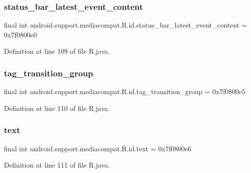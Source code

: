 \subsubsection{\texorpdfstring{status\_bar\_latest\_event\_content}{status\_bar\_latest\_event\_content}}
{\footnotesize\ttfamily final int android.\+support.\+mediacompat.\+R.\+id.\+status\+\_\+bar\+\_\+latest\+\_\+event\+\_\+content = 0x7f0800e0\hspace{0.3cm}{\ttfamily [static]}}



Definition at line 109 of file R.\+java.

\mbox{\label{classandroid_1_1support_1_1mediacompat_1_1_r_1_1id_a9bdc2a1b5e3044ae4478cdaf8ecdf1c5}} 
\subsubsection{\texorpdfstring{tag\_transition\_group}{tag\_transition\_group}}
{\footnotesize\ttfamily final int android.\+support.\+mediacompat.\+R.\+id.\+tag\+\_\+transition\+\_\+group = 0x7f0800e5\hspace{0.3cm}{\ttfamily [static]}}



Definition at line 110 of file R.\+java.

\mbox{\label{classandroid_1_1support_1_1mediacompat_1_1_r_1_1id_a27977888343c802d53fd8e31094c4d46}} 
\subsubsection{\texorpdfstring{text}{text}}
{\footnotesize\ttfamily final int android.\+support.\+mediacompat.\+R.\+id.\+text = 0x7f0800e6\hspace{0.3cm}{\ttfamily [static]}}



Definition at line 111 of file R.\+java.

